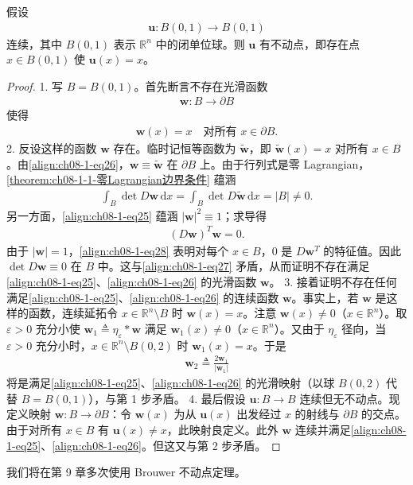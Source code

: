 \documentclass[../../main.tex]{subfiles}
\begin{document}
\begin{theorem}\label{theorem:ch08-1-3-Brouwer不动点}
假设
\begin{align*}
\mathbf{u}:B(0,1)\to B(0,1)
\end{align*}
连续，其中 $B(0,1)$ 表示 $\mathbb{R}^n$ 中的闭单位球。则 $\mathbf{u}$ 有不动点，即存在点 $x\in B(0,1)$ 使 $\mathbf{u}(x)=x$。
\begin{proof}
1. 写 $B=B(0,1)$。首先断言不存在光滑函数
\begin{align}
\mathbf{w}:B\to\partial B\label{align:ch08-1-eq25}
\end{align}
使得
\begin{align}
\mathbf{w}(x)=x\quad\text{对所有 }x\in\partial B.\label{align:ch08-1-eq26}
\end{align}
2. 反设这样的函数 $\mathbf{w}$ 存在。临时记恒等函数为 $\widetilde{\mathbf{w}}$，即 $\widetilde{\mathbf{w}}(x)=x$ 对所有 $x\in B$。由\eqref{align:ch08-1-eq26}，$\mathbf{w}\equiv\widetilde{\mathbf{w}}$ 在 $\partial B$ 上。由于行列式是零 Lagrangian，\cref{theorem:ch08-1-1-零Lagrangian边界条件} 蕴涵
\begin{align}
\int_B\det D\mathbf{w}\,\mathrm{d}x=\int_B\det D\widetilde{\mathbf{w}}\,\mathrm{d}x=|B|\neq 0.\label{align:ch08-1-eq27}
\end{align}
另一方面，\eqref{align:ch08-1-eq25} 蕴涵 $|\mathbf{w}|^2\equiv 1$；求导得
\begin{align}
(D\mathbf{w})^T\mathbf{w}=0.\label{align:ch08-1-eq28}
\end{align}
由于 $|\mathbf{w}|=1$，\eqref{align:ch08-1-eq28} 表明对每个 $x\in B$，$0$ 是 $D\mathbf{w}^T$ 的特征值。因此 $\det D\mathbf{w}\equiv 0$ 在 $B$ 中。这与\eqref{align:ch08-1-eq27} 矛盾，从而证明不存在满足\eqref{align:ch08-1-eq25}、\eqref{align:ch08-1-eq26} 的光滑函数 $\mathbf{w}$。
3. 接着证明不存在任何满足\eqref{align:ch08-1-eq25}、\eqref{align:ch08-1-eq26} 的连续函数 $\mathbf{w}$。事实上，若 $\mathbf{w}$ 是这样的函数，连续延拓令 $x\in\mathbb{R}^n\setminus B$ 时 $\mathbf{w}(x)=x$。注意 $\mathbf{w}(x)\neq 0$（$x\in\mathbb{R}^n$）。取 $\varepsilon>0$ 充分小使 $\mathbf{w}_1\triangleq\eta_\varepsilon*\mathbf{w}$ 满足 $\mathbf{w}_1(x)\neq 0$（$x\in\mathbb{R}^n$）。又由于 $\eta_\varepsilon$ 径向，当 $\varepsilon>0$ 充分小时，$x\in\mathbb{R}^n\setminus B(0,2)$ 时 $\mathbf{w}_1(x)=x$。于是
\begin{align*}
\mathbf{w}_2\triangleq\frac{2\mathbf{w}_1}{|\mathbf{w}_1|}
\end{align*}
将是满足\eqref{align:ch08-1-eq25}、\eqref{align:ch08-1-eq26} 的光滑映射（以球 $B(0,2)$ 代替 $B=B(0,1)$），与第 1 步矛盾。
4. 最后假设 $\mathbf{u}:B\to B$ 连续但无不动点。现定义映射 $\mathbf{w}:B\to\partial B$：令 $\mathbf{w}(x)$ 为从 $\mathbf{u}(x)$ 出发经过 $x$ 的射线与 $\partial B$ 的交点。由于对所有 $x\in B$ 有 $\mathbf{u}(x)\neq x$，此映射良定义。此外 $\mathbf{w}$ 连续并满足\eqref{align:ch08-1-eq25}、\eqref{align:ch08-1-eq26}。但这又与第 2 步矛盾。
\end{proof}
\end{theorem}

我们将在第 9 章多次使用 Brouwer 不动点定理。
\end{document}
